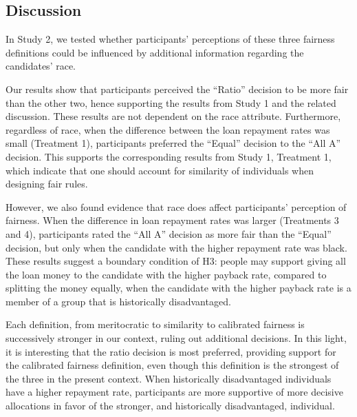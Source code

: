 \documentclass[letterpaper]{article} %
\begin{document}
 

 \subsection{Discussion} 
 In Study 2,  we tested whether participants' perceptions of these three fairness definitions could be influenced by additional information regarding the candidates' race. 
 
Our results show that participants perceived the ``Ratio'' decision to be more fair than the other two, hence supporting the results from Study 1 and the related discussion. These results are not dependent on the race attribute. Furthermore, regardless of race, when the difference between the  loan repayment rates was small (Treatment 1), participants preferred the ``Equal'' decision to the ``All A'' decision. This supports the corresponding results from Study 1, Treatment 1, which indicate that one should account for similarity of individuals when designing fair rules.   
 
However, we also found evidence that race does affect participants' perception of fairness. When the difference in loan repayment rates was larger (Treatments 3 and 4), participants rated the ``All A'' decision as more fair than the ``Equal'' decision, but only when the candidate with the higher repayment rate was black. These results suggest a boundary condition of H3: people may support giving all the loan money to the candidate with the higher payback rate, compared to splitting the money equally, when the candidate with the higher payback rate is a member of a group that is historically disadvantaged. 


Each definition, from meritocratic to similarity to calibrated fairness is successively stronger in our context, ruling out additional decisions. In this light, it is interesting that the ratio decision is most preferred, providing support for the calibrated fairness definition, even though this definition is the strongest of the three in the present context. When historically disadvantaged individuals have a higher repayment rate, participants are more supportive of more decisive allocations in favor of the stronger, and historically disadvantaged, individual.
\end{document}
